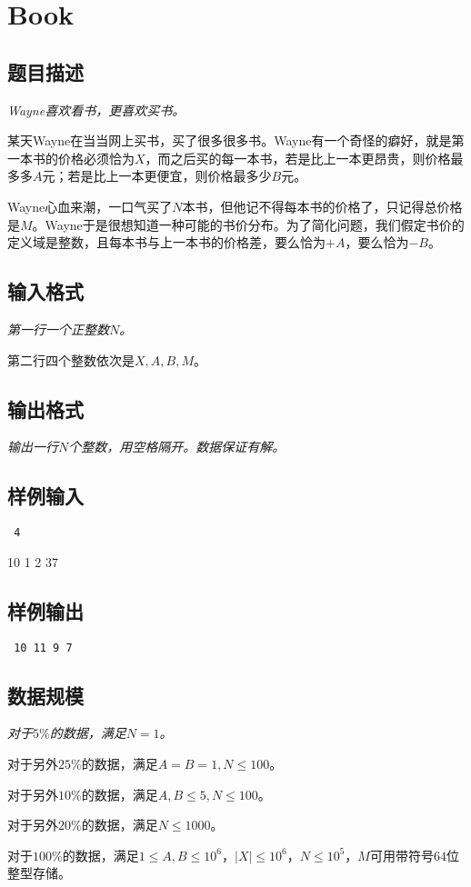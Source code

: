 \section{Book}
\subsection{题目描述}
{\itshape
Wayne喜欢看书，更喜欢买书。 \par
某天Wayne在当当网上买书，买了很多很多书。Wayne有一个奇怪的癖好，就是第一本书的价格必须恰为$X$，而之后买的每一本书，若是比上一本更昂贵，则价格最多多$A$元；若是比上一本更便宜，则价格最多少$B$元。 \par
Wayne心血来潮，一口气买了$N$本书，但他记不得每本书的价格了，只记得总价格是$M$。Wayne于是很想知道一种可能的书价分布。为了简化问题，我们假定书价的定义域是整数，且每本书与上一本书的价格差，要么恰为$+A$，要么恰为$-B$。 \par
}
\subsection{输入格式}
{\itshape
第一行一个正整数$N$。 \par
第二行四个整数依次是$X,A,B,M$。
}
\subsection{输出格式}
{\itshape
输出一行$N$个整数，用空格隔开。数据保证有解。
}
\subsection{样例输入}
{\tt
4 \par
10 1 2 37
}
\subsection{样例输出}
{\tt
10 11 9 7
}
\subsection{数据规模}
{\itshape
对于$5\%$的数据，满足$N = 1$。 \par
对于另外$25\%$的数据，满足$A = B = 1, N \le 100$。 \par
对于另外$10\%$的数据，满足$A,B \le 5, N \le 100$。 \par
对于另外$20\%$的数据，满足$N \le 1000$。 \par
对于$100\%$的数据，满足$1 \le A, B \le 10^6$，$|X| \le 10^6$，$N \le 10^5$，$M$可用带符号$64$位整型存储。
}
